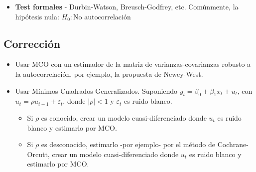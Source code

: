 \documentclass[10pt, a4paper, landscape]{extarticle}
\begin{document}
\begin{multicols}{3}
\begin{itemize}[leftmargin=*]
\begin{multicols}{3}

\end{multicols}

\item \textbf{Test formales} - Durbin-Watson, Breusch-Godfrey, etc. Comúnmente, la hipótesis nula: $H_0: \text{No autocorrelación}$

\end{itemize}

\subsection*{Corrección}

\begin{itemize}[leftmargin=*]
\item Usar MCO con un estimador de la matriz de varianzas-covarianzas robusto a la autocorrelación, por ejemplo, la propuesta de Newey-West.
\item Usar Mínimos Cuadrados Generalizados. Suponiendo $y_t = \beta_0 + \beta_1 x_t + u_t$, con $u_t = \rho u_{t-1} + \varepsilon_t$, donde $|\rho| < 1$ y $\varepsilon_t$ es ruido blanco.
\begin{itemize}[leftmargin=*]
\item Si $\rho$ es conocido, crear un modelo cuasi-diferenciado donde $u_t$ es ruido blanco y estimarlo por MCO.
\item Si $\rho$ es desconocido, estimarlo -por ejemplo- por el método de Cochrane-Orcutt, crear un modelo cuasi-diferenciado donde $u_t$ es ruido blanco y estimarlo por MCO.
\end{itemize}
\end{itemize}

\end{multicols}
\end{document}
